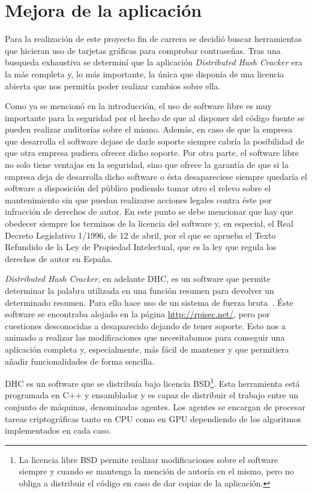 \chapter{Mejora de la aplicación}\label{cap4}

Para la realización de este proyecto fin de carrera se decidió buscar herramientas que hicieran uso de tarjetas gráficas para comprobar contraseñas. Tras una busqueda exhaustiva se determiní que la aplicación \emph{Distributed Hash Cracker} era la más completa y, lo más importante, la única que disponía de una licencia abierta que nos permitía poder realizar cambios sobre ella.

Como ya se mencionó en la introducción, el uso de software libre es muy importante para la seguridad por el hecho de que al disponer del código fuente se pueden realizar auditorías sobre el mismo. Además, en caso de que la empresa que desarrolla el software dejase de darle soporte siempre cabría la posibilidad de que otra empresa pudiera ofrecer dicho soporte. Por otra parte, el software libre no solo tiene ventajas en la seguridad, sino que ofrece la garantía de que si la empresa deja de desarrolla dicho software o ésta desapareciese siempre quedaría el software a disposición del público pudiendo tomar otro el relevo sobre el mantenimiento sin que puedan realizarse acciones legales contra éste por infracción de derechos de autor. En este punto se debe mencionar que hay que obedecer siempre los terminos de la licencia del software y, en especial, el Real Decreto Legislativo 1/1996, de 12 de abril, por el que se aprueba el Texto Refundido de la Ley de Propiedad Intelectual, que es la ley que regula los derechos de autor en España.

\emph{Distributed Hash Cracker}, en adelante DHC, es un software que permite determinar la palabra utilizada en una función resumen para devolver un determinado resumen. Para ello hace uso de un sistema de fuerza bruta~\cite{dhc:paper}. Éste software se encontraba alojado en la página \url{http://rpisec.net/}, pero por cuestiones desconocidas a desaparecido dejando de tener soporte. Esto nos a animado a realizar las modificaciones que necesitabamos para conseguir una aplicación completa y, especialmente, más fácil de mantener y que permitiera añadir funcionalidades de forma sencilla.

DHC es un software que se distribuía bajo licencia BSD\footnote{La licencia libre BSD permite realizar modificaciones sobre el software siempre y cuando se mantenga la mención de autoría en el mismo, pero no obliga a distribuir el código en caso de dar copias de la aplicación.}. Esta herramienta está programada en C++ y ensamblador y es capaz de distribuir el trabajo entre un conjunto de máquinas, denominadas agentes. Los agentes se encargan de procesar tareas criptográficas tanto en CPU como en GPU dependiendo de los algoritmos implementados en cada caso.

